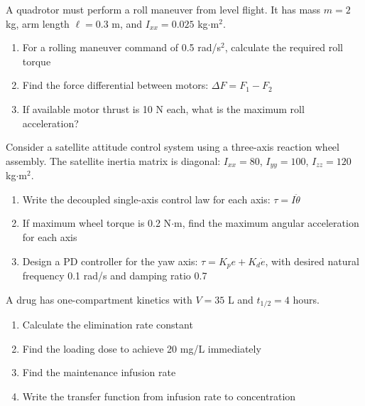 \begin{exercise}
A quadrotor must perform a roll maneuver from level flight. It has mass $m = 2$ kg, arm length $\ell = 0.3$ m, and $I_{xx} = 0.025$ kg$\cdot$m$^2$.
\begin{enumerate}[label=(\alph*)]
    \item For a rolling maneuver command of 0.5 rad/s$^2$, calculate the required roll torque
    \item Find the force differential between motors: $\Delta F = F_1 - F_2$
    \item If available motor thrust is 10 N each, what is the maximum roll acceleration?
\end{enumerate}
\end{exercise}

\begin{exercise}
Consider a satellite attitude control system using a three-axis reaction wheel assembly. The satellite inertia matrix is diagonal: $I_{xx} = 80$, $I_{yy} = 100$, $I_{zz} = 120$ kg$\cdot$m$^2$.
\begin{enumerate}[label=(\alph*)]
    \item Write the decoupled single-axis control law for each axis: $\tau = I \ddot{\theta}$
    \item If maximum wheel torque is 0.2 N$\cdot$m, find the maximum angular acceleration for each axis
    \item Design a PD controller for the yaw axis: $\tau = K_p e + K_d \dot{e}$, with desired natural frequency 0.1 rad/s and damping ratio 0.7
\end{enumerate}
\end{exercise}


\begin{exercise}
A drug has one-compartment kinetics with $V = 35$ L and $t_{1/2} = 4$ hours.
\begin{enumerate}[label=(\alph*)]
    \item Calculate the elimination rate constant
    \item Find the loading dose to achieve 20 mg/L immediately
    \item Find the maintenance infusion rate
    \item Write the transfer function from infusion rate to concentration
\end{enumerate}
\end{exercise}

